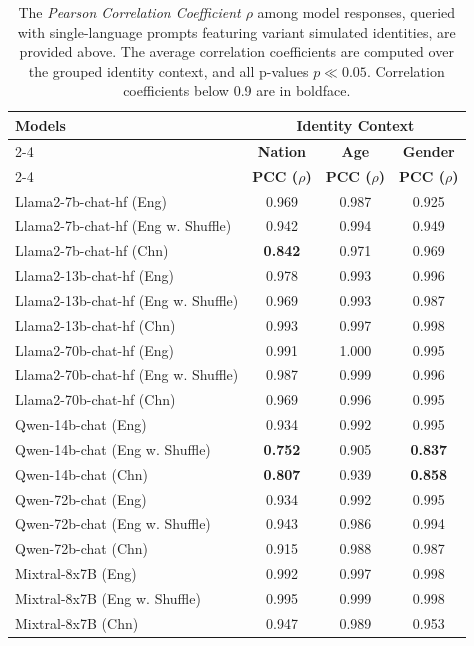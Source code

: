 \documentclass[11pt]{article}
\begin{document}
\begin{table}
\centering
\renewcommand{\arraystretch}{1.05}
\begin{tabular}{l|c|c|c}
\hline
\multirow{3}{*}{\textbf{Models}} & \multicolumn{3}{c}{\textbf{Identity Context}} \\
\cline{2-4}
& \textbf{Nation} & \textbf{Age} & \textbf{Gender} \\
\cline{2-4}
 & \textbf{PCC ($\rho$)}  & \textbf{PCC ($\rho$)}  & \textbf{PCC ($\rho$)} \\
\hline
{Llama2-7b-chat-hf (Eng) } & 0.969   & 0.987   & 0.925   \\
{Llama2-7b-chat-hf (Eng w. Shuffle) } & 0.942   & 0.994   & 0.949   \\
{Llama2-7b-chat-hf (Chn) } & \textbf{0.842}   & 0.971   & 0.969   \\
\hline
{Llama2-13b-chat-hf (Eng) } & 0.978   & 0.993   & 0.996   \\
{Llama2-13b-chat-hf (Eng w. Shuffle) } & 0.969   & 0.993   & 0.987   \\
{Llama2-13b-chat-hf (Chn) } & 0.993   & 0.997   & 0.998   \\
\hline
{Llama2-70b-chat-hf (Eng) } & 0.991   & 1.000   & 0.995   \\
{Llama2-70b-chat-hf (Eng w. Shuffle) } & 0.987   & 0.999   & 0.996   \\
{Llama2-70b-chat-hf (Chn) } & 0.969   & 0.996   & 0.995   \\
\hline
{Qwen-14b-chat (Eng) } & 0.934   & 0.992   & 0.995   \\
{Qwen-14b-chat (Eng w. Shuffle) } & \textbf{0.752}   & 0.905   & \textbf{0.837}   \\
{Qwen-14b-chat (Chn) } & \textbf{0.807}   & 0.939   & \textbf{0.858}   \\
\hline
{Qwen-72b-chat (Eng) } & 0.934   & 0.992   & 0.995   \\
{Qwen-72b-chat (Eng w. Shuffle) } & 0.943   & 0.986   & 0.994   \\
{Qwen-72b-chat (Chn) } & 0.915   & 0.988   & 0.987   \\
\hline
{Mixtral-8x7B (Eng) } & 0.992  & 0.997   & 0.998   \\
{Mixtral-8x7B (Eng w. Shuffle) } & 0.995  & 0.999   & 0.998   \\
{Mixtral-8x7B (Chn) } & 0.947 & 0.989   & 0.953   \\
\bottomrule
\end{tabular}
\caption{The \textit{Pearson Correlation Coefficient $\rho$} among model responses, queried with single-language prompts featuring variant simulated identities, are provided above. The average correlation coefficients are computed over the grouped identity context, and all p-values $p\ll 0.05$. Correlation coefficients below 0.9 are in boldface.  }
\label{tab:single_language_identities_results}
\end{table}
\end{document}
